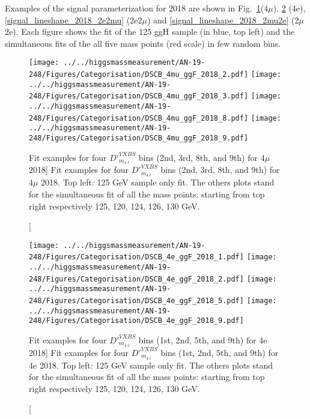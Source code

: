 Examples of the signal parameterization for 2018 are shown in 
Fig.~\ref{signal_lineshape_2018_4mu}(4$\mu$),
 \ref{signal_lineshape_2018_4e} (4e), 
 \ref{signal_lineshape_2018_2e2mu} (2e2$\mu$) and \ref{signal_lineshape_2018_2mu2e} (2$\mu$2e). 
 Each figure shows the fit of the 125 \GeV ggH sample (in blue, top left) and
the simultaneous fits of the all five mass points (red scale) in few random bins.
\begin{figure}[!htbp]
\begin{center}
	\texttt{[image: ../../higgsmassmeasurement/AN-19-248/Figures/Categorisation/DSCB\_4mu\_ggF\_2018\_2.pdf]}
	\texttt{[image: ../../higgsmassmeasurement/AN-19-248/Figures/Categorisation/DSCB\_4mu\_ggF\_2018\_3.pdf]}
	\texttt{[image: ../../higgsmassmeasurement/AN-19-248/Figures/Categorisation/DSCB\_4mu\_ggF\_2018\_8.pdf]}
	\texttt{[image: ../../higgsmassmeasurement/AN-19-248/Figures/Categorisation/DSCB\_4mu\_ggF\_2018\_9.pdf]}
\caption
[Fit examples for four $D'^{VXBS}_{m_{4\ell}}$ bins (2nd, 3rd, 8th, and 9th) 
for 4$\mu$ 2018]
{Fit examples for four $D'^{VXBS}_{m_{4\ell}}$ bins (2nd, 3rd, 8th, and 9th) 
for 4$\mu$ 2018. Top left: 125 GeV sample only fit. The others plots stand for the simultaneous 
fit of all the mass points: starting from top right respectively 125, 120, 124, 126, 130 GeV.}
\label{signal_lineshape_2018_4mu}
\end{center}
\end{figure}

\begin{figure}[!htbp]
\begin{center}
	\texttt{[image: ../../higgsmassmeasurement/AN-19-248/Figures/Categorisation/DSCB\_4e\_ggF\_2018\_1.pdf]}
	\texttt{[image: ../../higgsmassmeasurement/AN-19-248/Figures/Categorisation/DSCB\_4e\_ggF\_2018\_2.pdf]}
	\texttt{[image: ../../higgsmassmeasurement/AN-19-248/Figures/Categorisation/DSCB\_4e\_ggF\_2018\_5.pdf]}
	\texttt{[image: ../../higgsmassmeasurement/AN-19-248/Figures/Categorisation/DSCB\_4e\_ggF\_2018\_9.pdf]}
\caption
[Fit examples for four $D'^{VXBS}_{m_{4\ell}}$ bins (1st, 2nd, 5th, and 9th) 
for 4e 2018]
{Fit examples for four $D'^{VXBS}_{m_{4\ell}}$ bins (1st, 2nd, 5th, and 9th) 
for 4e 2018. Top left: 125 GeV sample only fit. The others plots stand for the simultaneous 
fit of all the mass points: starting from top right respectively 125, 120, 124, 126, 130 GeV.}
\label{signal_lineshape_2018_4e}
\end{center}
\end{figure}

